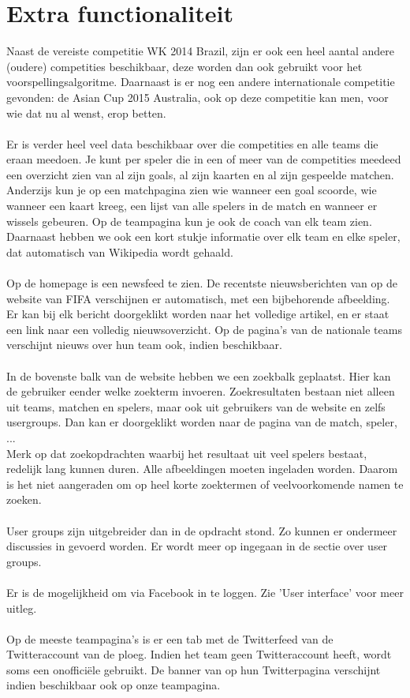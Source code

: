 \documentclass[11pt, a4paper]{article}
\begin{document}
\section{Extra functionaliteit}
Naast de vereiste competitie WK 2014 Brazil, zijn er ook een heel aantal andere (oudere) competities beschikbaar, deze worden dan ook gebruikt voor het voorspellingsalgoritme. Daarnaast is er nog een andere internationale competitie gevonden: de Asian Cup 2015 Australia, ook op deze competitie kan men, voor wie dat nu al wenst, erop betten. \\ \\
Er is verder heel veel data beschikbaar over die competities en alle teams die eraan meedoen. Je kunt per speler die in een of meer van de competities meedeed een overzicht zien van al zijn goals, al zijn kaarten en al zijn gespeelde matchen. Anderzijs kun je op een matchpagina zien wie wanneer een goal scoorde, wie wanneer een kaart kreeg, een lijst van alle spelers in de match en wanneer er wissels gebeuren. Op de teampagina kun je ook de coach van elk team zien. Daarnaast hebben we ook een kort stukje informatie over elk team en elke speler, dat automatisch van Wikipedia wordt gehaald. \\ \\
Op de homepage is een newsfeed te zien. De recentste nieuwsberichten van op de website van FIFA verschijnen er automatisch, met een bijbehorende afbeelding. Er kan bij elk bericht doorgeklikt worden naar het volledige artikel, en er staat een link naar een volledig nieuwsoverzicht. Op de pagina's van de nationale teams verschijnt nieuws over hun team ook, indien beschikbaar. \\ \\
In de bovenste balk van de website hebben we een zoekbalk geplaatst. Hier kan de gebruiker eender welke zoekterm invoeren. Zoekresultaten bestaan niet alleen uit teams, matchen en spelers, maar ook uit gebruikers van de website en zelfs usergroups. Dan kan er doorgeklikt worden naar de pagina van de match, speler, ... \\ Merk op dat zoekopdrachten waarbij het resultaat uit veel spelers bestaat, redelijk lang kunnen duren. Alle afbeeldingen moeten ingeladen worden. Daarom is het niet aangeraden om op heel korte zoektermen of veelvoorkomende namen te zoeken. \\ \\
User groups zijn uitgebreider dan in de opdracht stond. Zo kunnen er ondermeer discussies in gevoerd worden. Er wordt meer op ingegaan in de sectie over user groups. \\ \\
Er is de mogelijkheid om via Facebook in te loggen. Zie 'User interface' voor meer uitleg. \\ \\
Op de meeste teampagina's is er een tab met de Twitterfeed van de Twitteraccount van de ploeg. Indien het team geen Twitteraccount heeft, wordt soms een onoffici\"ele gebruikt. De banner van op hun Twitterpagina verschijnt indien beschikbaar ook op onze teampagina.
\end{document}
